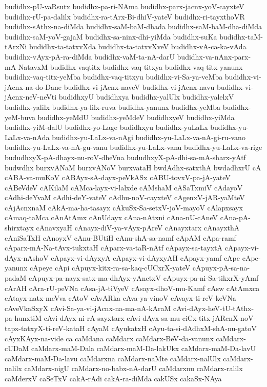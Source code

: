 {budidhx-pU-vaRsutx
budidhx-pa-ri-NAma
budidhx-parx-jacnx-yoV-cayxteV
budidhx-rU-pa-dalilx
budidhx-ra-tArx-Bi-dhiV-yateV
budidhx-ri-tayxthoVR
budidhx-sAthx-na-diMda
budidhx-saM-baM-dhada
budidhx-saM-baM-dha-diMda
budidhx-saM-yoV-gajaM
budidhx-sa-ninx-dhi-yiMda
budidhx-suKa
budidhx-taM-tArxNi
budidhx-ta-tatxvXda
budidhx-ta-tatxvXveV
budidhx-vA-ca-ka-vAda
budidhx-vAyx-pA-ra-diMda
budidhx-vaM-ta-nA-darU
budidhx-va-nAnx-parx-mA-NatavxM
budidhx-vaqtitx
budidhx-vaq-titxya
budidhx-vaq-titx-yanunx
budidhx-vaq-titx-yeMba
budidhx-vaq-titxyu
budidhx-vi-Sa-ya-veMba
budidhx-vi-jAcnx-na-do-Dane
budidhx-vi-jAcnx-naveV
budidhx-vi-jAcnx-navu
budidhx-vi-jAcnx-neV-neVti
budidhxyU
budidhxya
budidhx-yalUlx
budidhx-yalelxV
budidhx-yalilx
budidhx-ya-lilx-ruva
budidhx-yanunx
budidhx-yeMba
budidhx-yeM-buva
budidhx-yeMdU
budidhx-yeMdeV
budidhxyeV
budidhx-yiMda
budidhx-yiM-dalU
budidhx-yo-Lage
budidhxyu
budidhx-yuLaLx
budidhx-yu-LaLx-va-nAda
budidhx-yu-LaLx-va-nAgi
budidhx-yu-LaLx-va-nA-gi-ru-vano
budidhx-yu-LaLx-va-nA-gu-vanu
budidhx-yu-LaLx-vanu
budidhx-yu-LaLx-va-rige
bududhxyX-pA-dhayx-nu-roV-dheVna
bududhxyX-pA-dhi-sa-mA-sharx-yAtf
budwdhx
burxvANaM
burxvANoV
burxvataH
bwdAdhx-satxthA
bwdadhxrU
cA
cABA-va-muKoV
cABAyx-sA-dayx-peVkASx
cABU-tovxV-pa-jA-yateV
cABeVdeV
cAKilaM
cAMca-layx-vi-lalxde
cAMshaM
cASaTxmiV
cAdayoV
cAdhi-deYvaM
cAdhi-deY-vateV
cAdhu-noV-cayxteV
cAgenxV-jAR-yaMteV
cAjAcnxnaM
cAkA-ma-ha-tasayx
cAkuSx-Sa-setxV-joV-mayoV
cAlapxsayx
cAmaq-taMca
cAnAtAmx
cAnUdayx
cAna-nAtxni
cAna-nU-cAneV
cAna-pA-shirxtayx
cAnavxyaH
cAnayx-diV-ya-vAyx-pAreV
cAnayxtarx
cAnayxthA
cAniSaTxH
cAnoyxV
cAnu-BUtiH
cAnu-shA-sa-namf
cApAM
cApa-ramf
cAparx-mA-Na-tAvx-tukxtaH
cAparx-va-taR-nAtf
cApayx-sa-tayxtA
cApayx-vi-dAyx-nAshoV
cApayx-vi-dAyxyA
cApayx-vi-dAyxyAH
cApayx-yamf
cApe
cApe-yanunx
cApeye
cApi
cApuyx-kitx-ra-sa-kaq-cUCxrX-yateV
cApuyx-pA-sa-na-padaM
cApuyx-pa-nayx-satx-ma-dhAyx-yAnetxV
cApuyx-pa-ni-Sa-tikxrX-yAmf
cArAH
cAra-rU-peVNa
cAsa-jA-tiVyeV
cAsayx-dhoV-mu-Kamf
cAsw
cAtAmxca
cAtayx-natx-meVva
cAtoV
cAvARka
cAva-ya-vinoV
cAvayx-ti-reV-keVNa
cAveVkaSxyX
cAvi-Sa-ya-vi-jAcnx-na-ma-nA-kAraM
cAvi-dAyx-heV-tU-tAthx-pa-hunxtiM
cAvi-dAyx-ni-rA-sayxtarx
cAvi-dAyx-sa-mu-ciCx-titx-jARcnX-noV-tapx-tatxyX-ti-reV-kataH
cAyaM
cAyukatxH
cAyu-ta-si-dAdhxM-shA-nu-gatoV
cAyxKAyx-na-vide
ca
caMdana
caMdarx
caMdarx-BeV-da-vanunx
caMdarx-cUDaM
caMdarx-maM-Dala
caMdarx-maM-Da-lakUkx
caMdarx-maM-Da-lavU
caMdarx-maM-Da-lavu
caMdarxna
caMdarx-naMte
caMdarx-nalUlx
caMdarx-nalilx
caMdarx-nigU
caMdarx-no-babx-nA-darU
caMdarxnu
caMdarx-ralilx
caMderxV
caSeTxV
cakA-rAdi
cakA-ra-diMda
cakUSx
cakaSx-NAya
}
